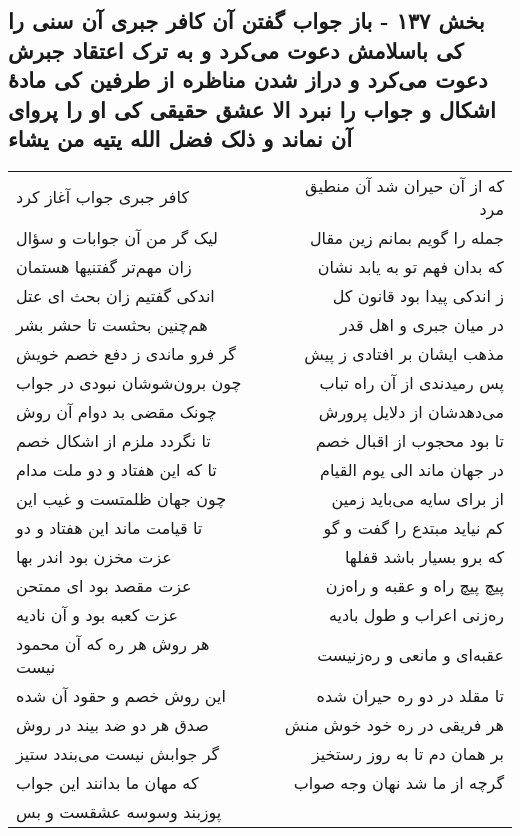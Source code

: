\begin{center}
\section*{بخش ۱۳۷ - باز جواب گفتن آن کافر جبری آن سنی را کی باسلامش دعوت می‌کرد و به ترک اعتقاد جبرش دعوت می‌کرد و دراز شدن  مناظره از طرفین کی مادهٔ اشکال و جواب را نبرد الا عشق حقیقی کی او را پروای آن نماند و ذلک فضل الله یتیه من یشاء}
\label{sec:sh137}
\begin{longtable}{l p{0.5cm} r}
کافر جبری جواب آغاز کرد
&&
که از آن حیران شد آن منطیق مرد
\\
لیک گر من آن جوابات و سؤال
&&
جمله را گویم بمانم زین مقال
\\
زان مهم‌تر گفتنیها هستمان
&&
که بدان فهم تو به یابد نشان
\\
اندکی گفتیم زان بحث ای عتل
&&
ز اندکی پیدا بود قانون کل
\\
هم‌چنین بحثست تا حشر بشر
&&
در میان جبری و اهل قدر
\\
گر فرو ماندی ز دفع خصم خویش
&&
مذهب ایشان بر افتادی ز پیش
\\
چون برون‌شوشان نبودی در جواب
&&
پس رمیدندی از آن راه تباب
\\
چونک مقضی بد دوام آن روش
&&
می‌دهدشان از دلایل پرورش
\\
تا نگردد ملزم از اشکال خصم
&&
تا بود محجوب از اقبال خصم
\\
تا که این هفتاد و دو ملت مدام
&&
در جهان ماند الی یوم القیام
\\
چون جهان ظلمتست و غیب این
&&
از برای سایه می‌باید زمین
\\
تا قیامت ماند این هفتاد و دو
&&
کم نیاید مبتدع را گفت و گو
\\
عزت مخزن بود اندر بها
&&
که برو بسیار باشد قفلها
\\
عزت مقصد بود ای ممتحن
&&
پیچ پیچ راه و عقبه و راه‌زن
\\
عزت کعبه بود و آن نادیه
&&
ره‌زنی اعراب و طول بادیه
\\
هر روش هر ره که آن محمود نیست
&&
عقبه‌ای و مانعی و ره‌زنیست
\\
این روش خصم و حقود آن شده
&&
تا مقلد در دو ره حیران شده
\\
صدق هر دو ضد بیند در روش
&&
هر فریقی در ره خود خوش منش
\\
گر جوابش نیست می‌بندد ستیز
&&
بر همان دم تا به روز رستخیز
\\
که مهان ما بدانند این جواب
&&
گرچه از ما شد نهان وجه صواب
\\
پوزبند وسوسه عشقست و بس

\end{longtable}
\end{center}
